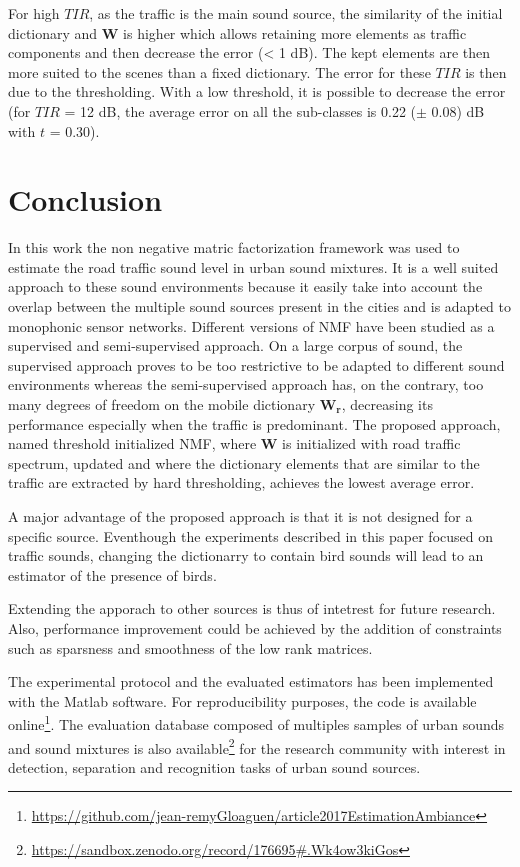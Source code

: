 \documentclass[twocolumn,a4paper,10pt]{article}
\begin{document}
For high $TIR$, as the traffic is the main sound source, the similarity of the initial dictionary and $\mathbf{W}$ is higher which allows retaining more elements as traffic components and then decrease the error (< 1 dB). The kept elements are then more suited to the scenes than a fixed dictionary. The error for these $TIR$ is then due to the thresholding. With a low threshold, it is possible to decrease the error (for $TIR$ = 12 dB, the average error on all the sub-classes is 0.22 ($\pm$ 0.08) dB with $t$ = 0.30).

\section{Conclusion}

In this work the non negative matric factorization framework  was used to estimate the road traffic sound level in urban sound mixtures. It is a well suited approach to these sound environments because it easily take into account the overlap between the multiple sound sources present in the cities and is adapted to monophonic sensor networks. Different versions of NMF have been studied as a supervised and semi-supervised approach. On a large corpus of sound, the supervised approach proves to be too restrictive to be adapted to different sound environments whereas the semi-supervised approach has, on the contrary, too many degrees of freedom on the mobile dictionary $\mathbf{W_r}$, decreasing its performance especially when the traffic is predominant. The proposed approach, named threshold initialized NMF, where $\mathbf{W}$ is initialized with road traffic spectrum, updated and where the dictionary elements that are similar to the traffic are extracted by hard thresholding, achieves the lowest average error. %

A major advantage of the proposed approach is that it is not designed for a specific source. Eventhough the experiments described in this paper focused on traffic sounds, changing the dictionarry to contain bird sounds will lead to an estimator of the presence of birds.

Extending the apporach to other sources is thus of intetrest for future research. Also, performance improvement could be achieved by the addition of constraints such as sparsness \cite{hoyer2004non} and smoothness \cite{virtanen_monaural_2007} of the low rank matrices.

The experimental protocol and the evaluated estimators has been implemented with the Matlab software. For reproducibility purposes, the code is available online\footnote{\url{https://github.com/jean-remyGloaguen/article2017EstimationAmbiance}}. The evaluation database composed of multiples samples of urban sounds and sound mixtures is also available\footnote{\url{https://sandbox.zenodo.org/record/176695#.Wk4ow3kiGos}} for the research community with interest in detection, separation and recognition tasks of urban sound sources.


\footnotesize


\end{document}

